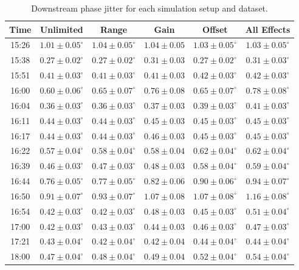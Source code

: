 \begin{table}
  \begin{center}
    \begin{tabular}{| c  c  c  c  c  c |}
	   \hline
       Time & Unlimited &  Range &  Gain &  Offset &  All Effects \\ \hline
15:26 & \(1.01\pm0.05^\circ\) & \(1.04\pm0.05^\circ\) & \(1.04\pm0.05\) & \(1.03\pm0.05^\circ\) & \(1.03\pm0.05^\circ\) \\
15:38 & \(0.27\pm0.02^\circ\) & \(0.27\pm0.02^\circ\) & \(0.31\pm0.03\) & \(0.27\pm0.02^\circ\) & \(0.31\pm0.03^\circ\) \\
15:51 & \(0.41\pm0.03^\circ\) & \(0.41\pm0.03^\circ\) & \(0.41\pm0.03\) & \(0.42\pm0.03^\circ\) & \(0.42\pm0.03^\circ\) \\
16:00 & \(0.60\pm0.06^\circ\) & \(0.65\pm0.07^\circ\) & \(0.76\pm0.08\) & \(0.65\pm0.07^\circ\) & \(0.78\pm0.08^\circ\) \\
16:04 & \(0.36\pm0.03^\circ\) & \(0.36\pm0.03^\circ\) & \(0.37\pm0.03\) & \(0.39\pm0.03^\circ\) & \(0.41\pm0.03^\circ\) \\
16:11 & \(0.44\pm0.03^\circ\) & \(0.44\pm0.03^\circ\) & \(0.45\pm0.03\) & \(0.45\pm0.03^\circ\) & \(0.45\pm0.03^\circ\) \\
16:17 & \(0.44\pm0.03^\circ\) & \(0.44\pm0.03^\circ\) & \(0.46\pm0.03\) & \(0.45\pm0.03^\circ\) & \(0.45\pm0.03^\circ\) \\
16:22 & \(0.57\pm0.04^\circ\) & \(0.58\pm0.04^\circ\) & \(0.58\pm0.04\) & \(0.62\pm0.04^\circ\) & \(0.62\pm0.04^\circ\) \\
16:39 & \(0.46\pm0.03^\circ\) & \(0.47\pm0.03^\circ\) & \(0.48\pm0.03\) & \(0.58\pm0.04^\circ\) & \(0.59\pm0.04^\circ\) \\
16:44 & \(0.76\pm0.05^\circ\) & \(0.77\pm0.05^\circ\) & \(0.82\pm0.06\) & \(0.90\pm0.06^\circ\) & \(0.94\pm0.07^\circ\) \\
16:50 & \(0.91\pm0.07^\circ\) & \(0.93\pm0.07^\circ\) & \(1.07\pm0.08\) & \(1.07\pm0.08^\circ\) & \(1.16\pm0.08^\circ\) \\
16:54 & \(0.42\pm0.03^\circ\) & \(0.42\pm0.03^\circ\) & \(0.48\pm0.03\) & \(0.45\pm0.03^\circ\) & \(0.51\pm0.04^\circ\) \\
17:00 & \(0.42\pm0.03^\circ\) & \(0.43\pm0.03^\circ\) & \(0.44\pm0.03\) & \(0.46\pm0.03^\circ\) & \(0.47\pm0.03^\circ\) \\
17:21 & \(0.43\pm0.04^\circ\) & \(0.42\pm0.04^\circ\) & \(0.42\pm0.04\) & \(0.44\pm0.04^\circ\) & \(0.44\pm0.04^\circ\) \\
18:00 & \(0.47\pm0.04^\circ\) & \(0.48\pm0.04^\circ\) & \(0.49\pm0.04\) & \(0.52\pm0.04^\circ\) & \(0.54\pm0.04^\circ\) \\ \hline
    \end{tabular}
    \caption{Downstream phase jitter for each simulation setup and dataset.}
  	\label{t:LongFFIndivSim}
  \end{center}
\end{table}


